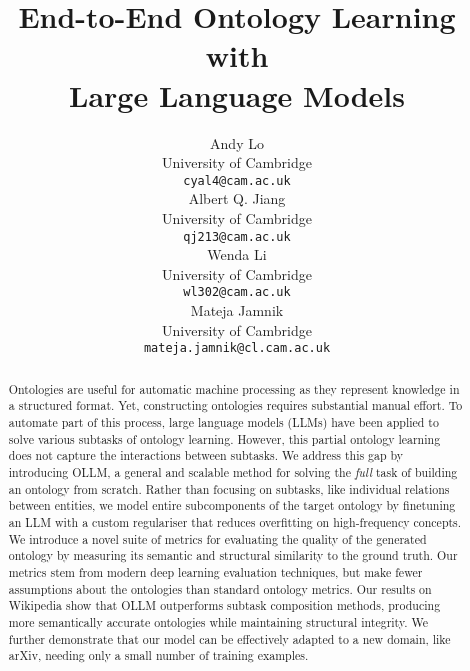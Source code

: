 \documentclass{article}
\title{End-to-End Ontology Learning with \\Large Language Models}
\author{%
    Andy Lo \\
    University of Cambridge\\
    \texttt{cyal4@cam.ac.uk} \\
    Albert Q. Jiang \\
    University of Cambridge\\
    \texttt{qj213@cam.ac.uk} \\
    Wenda Li \\
    University of Cambridge\\
    \texttt{wl302@cam.ac.uk} \\
    Mateja Jamnik \\
    University of Cambridge\\
    \texttt{mateja.jamnik@cl.cam.ac.uk} \\
}
\newcommand{\name}{{OLLM}\xspace}
\begin{document}
\maketitle

\begin{abstract}
    Ontologies are useful for automatic machine processing as they represent knowledge in a structured format. Yet, constructing ontologies requires substantial manual effort. To automate part of this process, large language models (LLMs) have been applied to solve various subtasks of ontology learning. However, this partial ontology learning does not capture the interactions between subtasks.
    We address this gap by introducing \name, a general and scalable method for solving the \emph{full} task of building an ontology from scratch.
    Rather than focusing on subtasks, like individual relations between entities, we model entire subcomponents of the target ontology by finetuning an LLM with a custom regulariser that reduces overfitting on high-frequency concepts. We introduce a novel suite of metrics for evaluating the quality of the generated ontology by measuring its semantic and structural similarity to the ground truth. Our metrics stem from modern deep learning evaluation techniques, but make fewer assumptions about the ontologies than standard ontology metrics.
    Our results on Wikipedia show that \name outperforms subtask composition methods, producing more semantically accurate ontologies while maintaining structural integrity. We further demonstrate that our model can be effectively adapted to a new domain, like arXiv, needing only a small number of training examples.
\end{abstract}


\end{document}

